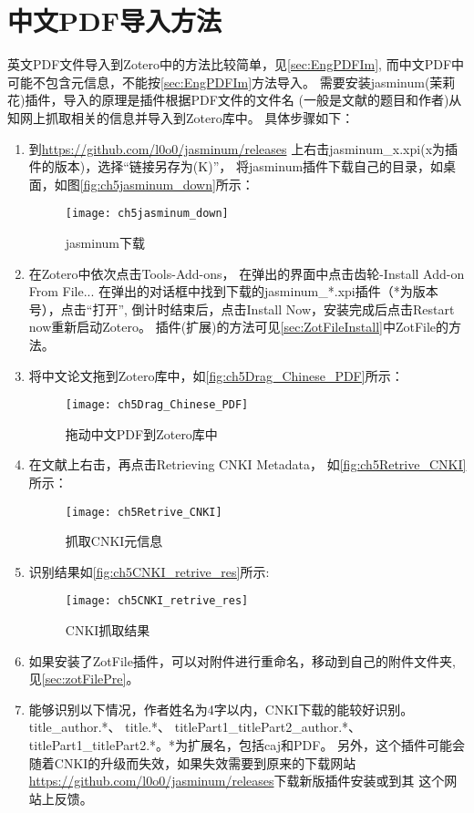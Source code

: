\documentclass[cn,11pt,chinese]{elegantbook}
\begin{document}
		\section{中文PDF导入方法}\label{sec:Chinese_PDF}
			英文PDF文件导入到Zotero中的方法比较简单，见\cref{sec:EngPDFIm},
			而中文PDF中可能不包含元信息，不能按\cref{sec:EngPDFIm}方法导入。
			需要安装jasminum(茉莉花)插件，导入的原理是插件根据PDF文件的文件名
			(一般是文献的题目和作者)从知网上抓取相关的信息并导入到Zotero库中。
			具体步骤如下：
			\begin{enumerate}
				\item 到\url{https://github.com/l0o0/jasminum/releases}
				上右击jasminum\_x.xpi(x为插件的版本)，选择“链接另存为(K)”，
				将jasminum插件下载自己的目录，如桌面，如图\autoref{fig:ch5jasminum_down}所示：
	    		\begin{figure}[ht]
					\centering
					\texttt{[image: ch5jasminum\_down]}
					\caption{jasminum下载}
					\label{fig:ch5jasminum_down}
	    		\end{figure}
				\item 在Zotero中依次点击Tools-Add-ons，
				在弹出的界面中点击齿轮-Install Add-on From File...
				在弹出的对话框中找到下载的jasminum\_*.xpi插件（*为版本号），点击“打开”,
				倒计时结束后，点击Install Now，安装完成后点击Restart now重新启动Zotero。
				插件(扩展)的方法可见\cref{sec:ZotFileInstall}中ZotFile的方法。
				\item 将中文论文拖到Zotero库中，如\autoref{fig:ch5Drag_Chinese_PDF}所示：
					\begin{figure}[ht]
						\centering
						\texttt{[image: ch5Drag\_Chinese\_PDF]}
						\caption{拖动中文PDF到Zotero库中}
						\label{fig:ch5Drag_Chinese_PDF}
					\end{figure}
				\item 在文献上右击，再点击Retrieving CNKI Metadata，
				如\autoref{fig:ch5Retrive_CNKI}所示：
					\begin{figure}[ht]
						\centering
						\texttt{[image: ch5Retrive\_CNKI]}
						\caption{抓取CNKI元信息}
						\label{fig:ch5Retrive_CNKI}
					\end{figure}
				\item 识别结果如\autoref{fig:ch5CNKI_retrive_res}所示:
					\begin{figure}[ht]
						\centering
						\texttt{[image: ch5CNKI\_retrive\_res]}
						\caption{CNKI抓取结果}
						\label{fig:ch5CNKI_retrive_res}
					\end{figure}
				\item 如果安装了ZotFile插件，可以对附件进行重命名，移动到自己的附件文件夹,
				见\cref{sec:zotFilePre}。
				\item 能够识别以下情况，作者姓名为4字以内，CNKI下载的能较好识别。
				title\_author.*、
				title.*、
				titlePart1\_titlePart2\_author.*、
				titlePart1\_titlePart2.*。*为扩展名，包括caj和PDF。
				另外，这个插件可能会随着CNKI的升级而失效，如果失效需要到原来的下载网站
				\url{https://github.com/l0o0/jasminum/releases}下载新版插件安装或到其
				这个网站上反馈。


			\end{enumerate}
				
\end{document}
